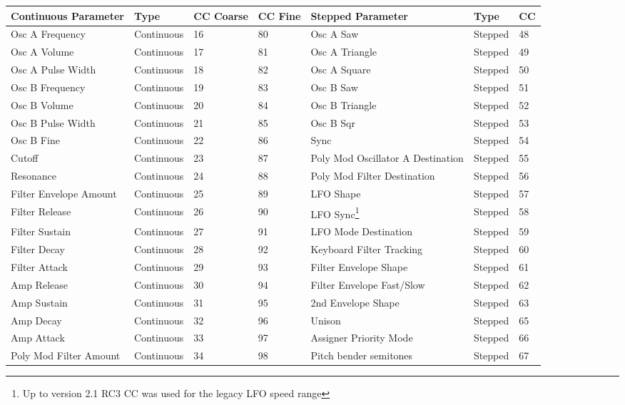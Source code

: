 \begin{longtable}[l]{ p{5cm}|p{2cm}|p{1.5cm}|p{1.5cm}|p{5cm}|p{2cm}|p{1cm}} 
\textbf{Continuous Parameter} & \textbf{Type} & \textbf{ CC Coarse} & \textbf{CC Fine} & \textbf{Stepped Parameter} & \textbf{Type} & \textbf{CC} \\ \hline
Osc A Frequency & Continuous & 16 & 80 & Osc A Saw & Stepped & 48 \\ \hline
Osc A Volume & Continuous & 17 & 81 & Osc A Triangle & Stepped & 49 \\ \hline
Osc A Pulse Width & Continuous & 18 & 82 & Osc A Square & Stepped & 50 \\ \hline
Osc B Frequency & Continuous & 19 & 83 & Osc B Saw & Stepped & 51 \\ \hline
Osc B Volume & Continuous & 20 & 84 & Osc B Triangle & Stepped & 52 \\ \hline
Osc B Pulse Width & Continuous & 21 & 85 & Osc B Sqr & Stepped & 53 \\ \hline
Osc B Fine & Continuous & 22 & 86 & Sync & Stepped & 54 \\ \hline
Cutoff & Continuous & 23 & 87 & Poly Mod Oscillator A Destination & Stepped & 55 \\ \hline
Resonance & Continuous & 24 & 88 & Poly Mod Filter Destination & Stepped & 56 \\ \hline
Filter Envelope Amount & Continuous & 25 & 89 & LFO Shape & Stepped & 57 \\ \hline
Filter Release & Continuous & 26 & 90 & LFO Sync\footnote{Up to version 2.1 RC3 CC was used for the legacy LFO speed range} & Stepped & 58 \\ \hline
Filter Sustain & Continuous & 27 & 91 & LFO Mode Destination & Stepped & 59 \\ \hline
Filter Decay & Continuous & 28 & 92 & Keyboard Filter Tracking & Stepped & 60 \\ \hline
Filter Attack & Continuous & 29 & 93 & Filter Envelope Shape & Stepped & 61 \\ \hline
Amp Release & Continuous & 30 & 94 & Filter Envelope Fast/Slow & Stepped & 62 \\ \hline
Amp Sustain & Continuous & 31 & 95 & 2nd Envelope Shape & Stepped & 63 \\ \hline
Amp Decay & Continuous & 32 & 96 & Unison & Stepped & 65 \\ \hline
Amp Attack & Continuous & 33 & 97 & Assigner Priority Mode & Stepped & 66 \\ \hline
Poly Mod Filter Amount & Continuous & 34 & 98 & Pitch bender semitones & Stepped & 67 \\ \hline

\end{longtable}
